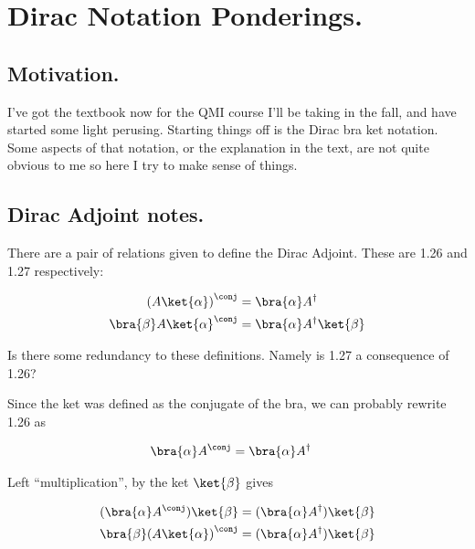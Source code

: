 
%

\chapter{Dirac Notation Ponderings.}
\label{chap:desaiDiracNotes}
{}
\date{June 23, 2010}

\beginArtNoToc

\section{Motivation.}

I've got the textbook \cite{desai2009quantum} now for the QMI course I'll be taking in the fall, and have started some light perusing.  Starting things off is the Dirac bra ket notation.  Some aspects of that notation, or the explanation in the text, are not quite obvious to me so here I try to make sense of things.

\section{Dirac Adjoint notes.}

There are a pair of relations given to define the Dirac Adjoint.  These are 1.26 and 1.27 respectively:

\begin{align*}
\left( A \ket{\alpha} \right)^\conj &= \bra{\alpha} A^\dagger \\
{\bra{\beta} A \ket{\alpha}}^\conj &= \bra{\alpha} A^\dagger \ket{\beta}
\end{align*}

Is there some redundancy to these definitions.  Namely is 1.27 a consequence of 1.26?

Since the ket was defined as the conjugate of the bra, we can probably rewrite 1.26 as

\begin{align*}
\bra{\alpha} A^\conj &= \bra{\alpha} A^\dagger 
\end{align*}

Left ``multiplication'', by the ket $\ket{\beta}$ gives

\begin{align*}
(\bra{\alpha} A^\conj) \ket{\beta} &= (\bra{\alpha} A^\dagger) \ket{\beta} \\
{\bra{\beta} (A \ket{\alpha})}^\conj &= (\bra{\alpha} A^\dagger) \ket{\beta} \\
\end{align*}

